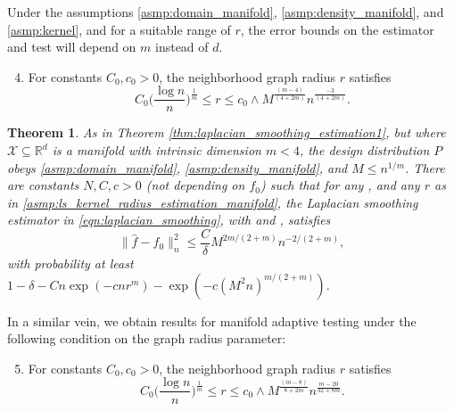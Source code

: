 \documentclass[twoside]{article}
\newcommand{\Reals}{\mathbb{R}}
\newcommand{\1}{\mathbf{1}}
\newcommand{\Rd}{\Reals^d}
\newcommand{\Xset}{\mathcal{X}}
\newcommand{\wh}[1]{\widehat{#1}}
\newtheorem{theorem}{Theorem}
\theoremstyle{definition}
\theoremstyle{remark}
\begin{document}
Under the assumptions \ref{asmp:domain_manifold}, \ref{asmp:density_manifold}, and \ref{asmp:kernel}, and for a suitable range of $r$, the error bounds on the estimator \smash{$\wh{f}$} and test \smash{$\wh{\varphi}$} will depend on $m$ instead of $d$. 
\begin{enumerate}[label=(R\arabic*)]
	\setcounter{enumi}{3}
	\item 
	\label{asmp:ls_kernel_radius_estimation_manifold}
	For constants $C_0,c_0>0$, the neighborhood graph radius $r$ satisfies 
	\begin{equation*}
	C_0\biggl(\frac{\log n}{n}\biggr)^{\frac{1}{m}} \leq r \leq c_0 \wedge  M^{\frac{(m - 4)}{(4 + 2m)}} n^{\frac{-3}{(4 + 2m)}}.
	\end{equation*}
\end{enumerate}

\begin{theorem}
	\label{thm:laplacian_smoothing_estimation_manifold}
	As in Theorem \ref{thm:laplacian_smoothing_estimation1}, but where $\Xset \subseteq \Rd$ is a manifold with intrinsic dimension $m < 4$, the design distribution $P$ obeys \ref{asmp:domain_manifold}, \ref{asmp:density_manifold}, and $M \leq n^{1/m}$. There are constants $N,C,c>0$ (not depending on $f_0$) such that for any , and any $r$ as in \ref{asmp:ls_kernel_radius_estimation_manifold}, the Laplacian smoothing estimator \smash{$\wh{f}$} in \eqref{eqn:laplacian_smoothing}, with  and , satisfies
	\begin{equation*}
	\bigl\|\wh{f} - f_0\bigr\|_n^2 \leq \frac{C}{\delta} M^{2m/(2 + m)} n^{-2/(2 + m)},
	\end{equation*}
	with probability at least $1 - \delta -  Cn\exp(-cnr^m) - \exp(-c(M^2n)^{m/(2+m)})$.
\end{theorem}
In a similar vein, we obtain results for manifold adaptive testing under the following condition on the graph radius parameter:
\begin{enumerate}[label=(R\arabic*)]
	\setcounter{enumi}{4}
	\item 
	\label{asmp:ls_kernel_radius_testing_manifold}
	For constants $C_0,c_0>0$, the neighborhood graph radius $r$ satisfies 
	\begin{equation*}
	C_0\biggl(\frac{\log n}{n}\biggr)^{\frac{1}{m}} \leq r \leq c_0 \wedge M^{\frac{(m - 8)}{8 + 2m}} n^{\frac{m - 20}{32 + 8m}}.
	\end{equation*}
\end{enumerate}
\end{document}
